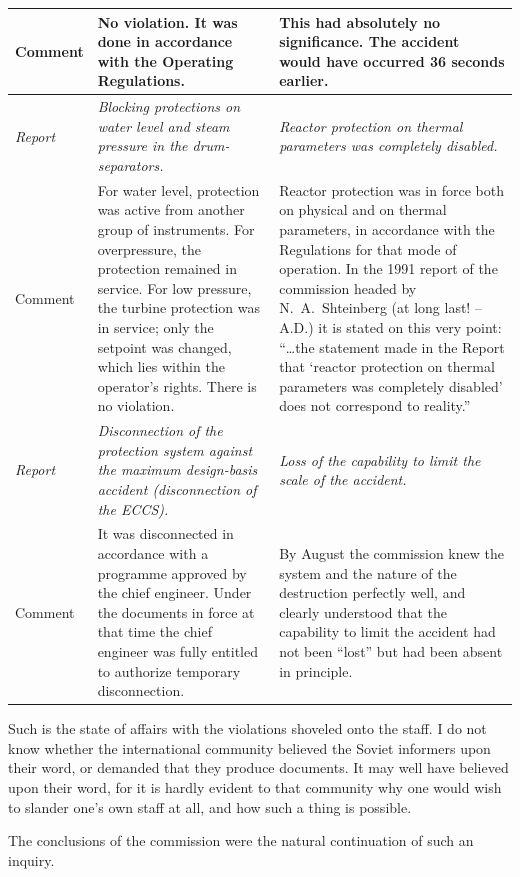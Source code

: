 \documentclass[openright]{bookest}
\begin{document}
\begin{center}
\begin{longtable}{|p{4em}|p{13.5em}|p{13.5em}|}
    \hline
    Comment & No violation. It was done in accordance with the Operating Regulations. & This had absolutely no significance. The accident would have occurred \num{36} seconds earlier. \\
    \hline
    \textit{Report} & \textit{Blocking protections on water level and steam pressure in the drum-separators.} & \textit{Reactor protection on thermal parameters was completely disabled.} \\
    \hline
    Comment & For water level, protection was active from another group of instruments. For overpressure, the protection remained in service. For low pressure, the turbine protection was in service; only the setpoint was changed, which lies within the operator's rights. There is no violation. & Reactor protection was in force both on physical and on thermal parameters, in accordance with the Regulations for that mode of operation. In the 1991 report of the commission headed by N.~A.~Shteinberg (at long last! -- A.D.) it is stated on this very point: ``\ldots the statement made in the Report that `reactor protection on thermal parameters was completely disabled' does not correspond to reality.'' \\
    \hline
    \textit{Report} & \textit{Disconnection of the protection system against the maximum design-basis accident (disconnection of the ECCS).} & \textit{Loss of the capability to limit the scale of the accident.} \\
    \hline
    Comment & It was disconnected in accordance with a programme approved by the chief engineer. Under the documents in force at that time the chief engineer was fully entitled to authorize temporary disconnection. & By August the commission knew the system and the nature of the destruction perfectly well, and clearly understood that the capability to limit the accident had not been ``lost'' but had been absent in principle. \\
    \hline
  \end{longtable}
\end{center}\normalsize

Such is the state of affairs with the violations shoveled onto the staff. I do not know whether the international community believed the Soviet informers upon their word, or demanded that they produce documents. It may well have believed upon their word, for it is hardly evident to that community why one would wish to slander one's own staff at all, and how such a thing is possible.

The conclusions of the commission were the natural continuation of such an inquiry.
\end{document}
